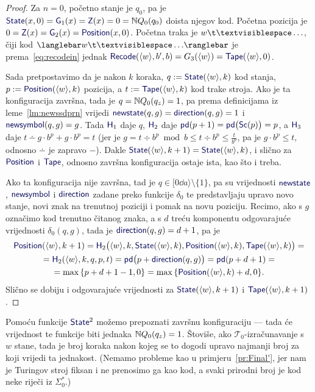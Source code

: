 \begin{proof}
Za $n=0$, početno stanje je $q_0$, pa je $\f{State}(x,0)=\f G_1(x)=\f Z(x)=0=\N Q_0(q_0)$ doista njegov kod. Početna pozicija je $0=\f Z(x)=\f G_2(x)=\f{Position}(x,0)$. Početna traka je $w\bl\ldots$, čiji kod $\knk{w\bl\ldots}$ je prema~\eqref{eq:recodein} jednak $\f{Recode}(\kr w,b',b)=G_3(\kr w)=\f{Tape}(\kr w,0)$.

Sada pretpostavimo da je nakon $k$ koraka, $q:=\f{State}(\kr w,k)$ kod stanja, $p:=\f{Position}(\kr w,k)$ pozicija, a $t:=\f{Tape}(\kr w,k)$ kod trake stroja. Ako je ta konfiguracija završna, tada je $q={\mathbb N} Q_0(q_z)=1$, pa prema definicijama iz leme~\ref{lm:newssdprn} vrijedi $\f{newstate}(q,g)=\f{direction}(q,g)=1$ i $\f{newsymbol}(q,g)=g$. Tada $\f H_1$ daje $q$, $\f H_2$ daje $\f{pd}(p+1)=\f{pd}\bigl(\f{Sc}(p)\bigr)=p$, a $\f H_3$ daje $t\dotminus g\cdot b^p+g\cdot b^p=t$ (jer je $g=t\div b^p\bmod b\le t\div b^p\le\frac{t}{b^p}$, pa je $g\cdot b^p\le t$, odnosno $\dotminus$ je zapravo $-$). Dakle $\f{State}(\kr w,k+1)=\f{State}(\kr w,k)$, i slično za $\f{Position}$ i $\f{Tape}$, odnosno završna konfiguracija ostaje ista, kao što i treba.

Ako ta konfiguracija nije završna, tad je $q\in[0\dd a\rangle\setminus\{1\}$, pa su vrijednosti $\f{newstate}$, $\f{newsymbol}$ i $\f{direction}$ zadane preko funkcije $\delta_0$ te predstavljaju upravo novo stanje, novi znak na trenutnoj poziciji i pomak na novu poziciju. Recimo, ako s $g$ označimo kod trenutno čitanog znaka, a s $d$ treću komponentu odgovarajuće vrijednosti $\delta_0(q,g)$, tada je $\f{direction}(q,g)=d+1$, pa je
\begin{multline}
    \f{Position}(\kr w,k+1)=\f H_2\bigl(\kr w,k,\f{State}(\kr w,k),\f{Position}(\kr w, k),\f{Tape}(\kr w,k)\bigr)=\\
    =\f H_2(\kr w,k,q,p,t)=
    \f{pd}\bigl(p+\f{direction}(q,g)\bigr)=\f{pd}(p+d+1)=\\
    =\max\,\{p+d+1-1,0\}=\max\,\{\f{Position}(\kr w,k)+d,0\}\text.
\end{multline}
Slično se dobiju i odgovarajuće vrijednosti za $\f{State}(\kr w,k+1)$ i $\f{Tape}(\kr w,k+1)$.
\end{proof}


Pomoću funkcije $\f{State}^2$ možemo prepoznati završnu konfiguraciju --- tada će vrijednost te funkcije biti jednaka ${\mathbb N} Q_0(q_z)=1$. Štoviše, ako $\mathcal T_0$-izračunavanje s $w$ stane, tada je broj koraka nakon kojeg se to dogodi upravo najmanji broj za koji vrijedi ta jednakost. (Nemamo probleme kao u primjeru~\ref{pr:Final'}, jer nam je Turingov stroj fiksan i ne prenosimo ga kao kod, a svaki prirodni broj je kod neke riječi iz $\Sigma_0^*$.)

